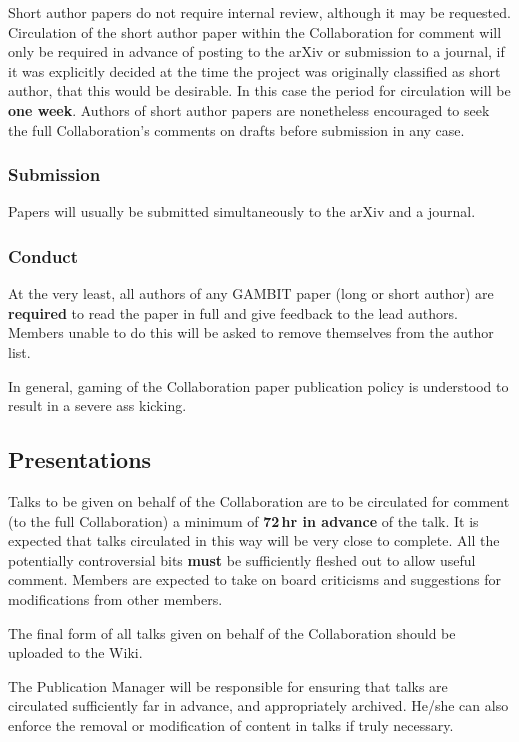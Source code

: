 Short author papers do not require internal review, although it may be requested.  Circulation of the short author paper within the Collaboration for comment will only be required in advance of posting to the arXiv or submission to a journal, if it was explicitly decided at the time the project was originally classified as short author, that this would be desirable.  In this case the period for circulation will be \textbf{one week}.  Authors of short author papers are nonetheless encouraged to seek the full Collaboration's comments on drafts before submission in any case.

\subsubsection{Submission}

Papers will usually be submitted simultaneously to the arXiv and a journal.

\subsubsection{Conduct}

At the very least, all authors of any GAMBIT paper (long or short author) are \textbf{required} to read the paper in full and give feedback to the lead authors.  Members unable to do this will be asked to remove themselves from the author list.

In general, gaming of the Collaboration paper publication policy is understood to result in a severe ass kicking.

\subsection{Presentations}

Talks to be given on behalf of the Collaboration are to be circulated for comment (to the full Collaboration) a minimum of \textbf{72\,hr in advance} of the talk.  It is expected that talks circulated in this way will be very close to complete.  All the potentially controversial bits \textbf{must} be sufficiently fleshed out to allow useful comment.  Members are expected to take on board criticisms and suggestions for modifications from other members.  

The final form of all talks given on behalf of the Collaboration should be uploaded to the Wiki.

The Publication Manager will be responsible for ensuring that talks are circulated sufficiently far in advance, and appropriately archived.  He/she can also enforce the removal or modification of content in talks if truly necessary.

